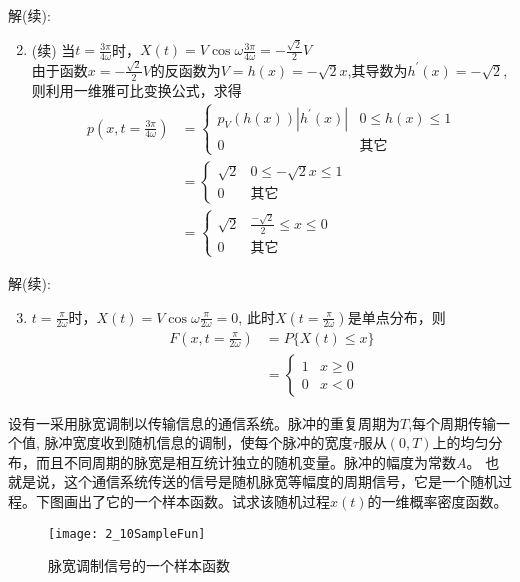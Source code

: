\begin{frame}
解(续):
\begin{enumerate}
	\setcounter{enumi}{1} %
	\item (续) 当$t=\frac{3\pi}{4\omega}$时，$X(t)=V\cos\omega\frac{3\pi}{4\omega}=-\frac{\sqrt{2}}{2}V$\\
	由于函数$x=-\frac{\sqrt{2}}{2}V$的反函数为$V=h(x)=-\sqrt{2}x$,其导数为$h^\prime(x)=-\sqrt{2}$,则利用一维雅可比变换公式，求得
	\begin{align*}
		p(x,t=\frac{3\pi}{4\omega}) &=\begin{cases}
		p_V(h(x))|h^\prime(x)| &0\le h(x)\le 1\\
		0 &\text{其它}
		\end{cases}\\
		&=\begin{cases}
		\sqrt{2} &0\le -\sqrt{2}x\le 1\\
		0 &\text{其它}
		\end{cases}\\
		&=\begin{cases}
		\sqrt{2} &\frac{-\sqrt{2}}{2}\le x\le 0\\
		0 &\text{其它}
		\end{cases}
	\end{align*}
\end{enumerate}
\end{frame}

\begin{frame}
解(续):
\begin{enumerate}
	\setcounter{enumi}{2} %
	\item $t=\frac{\pi}{2\omega}$时，$X(t)=V\cos\omega\frac{\pi}{2\omega}=0$, 此时$X(t=\frac{\pi}{2\omega})$是单点分布，则
	\begin{align*}
	F(x,t=\frac{\pi}{2\omega}) &=P\{X(t)\le x \}\\
	&=\begin{cases}
	1 &x\ge 0\\
	0 &x<0
	\end{cases}
	\end{align*}
\end{enumerate}
\end{frame}

\begin{frame}
\begin{example}
设有一采用脉宽调制以传输信息的通信系统。脉冲的重复周期为$T$,每个周期传输一个值, 脉冲宽度收到随机信息的调制，使每个脉冲的宽度$\tau$服从$(0,T)$上的均匀分布，而且不同周期的脉宽是相互统计独立的随机变量。脉冲的幅度为常数$A$。 也就是说，这个通信系统传送的信号是随机脉宽等幅度的周期信号，它是一个随机过程。下图画出了它的一个样本函数。试求该随机过程$x(t)$的一维概率密度函数。
\end{example}
\begin{figure}
	\texttt{[image: 2\_10SampleFun]}
	\caption {脉宽调制信号的一个样本函数}
\end{figure}
\end{frame}

